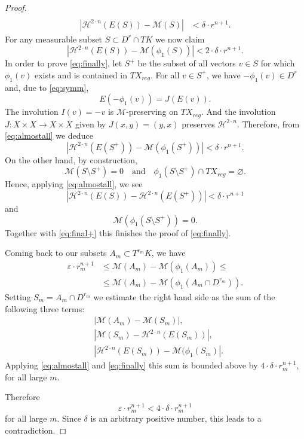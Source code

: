 \documentclass[12pt,leqno,intlimits]{amsart}
\numberwithin{equation}{section}
\theoremstyle{definition}
\theoremstyle{remark}
\def\:{\colon}
\def\emptyset{\varnothing}
\begin{document}
\begin{proof}
\begin{equation}
\begin{aligned}
\\
|\mathcal H^{2\cdot n} (E(S)) - \mathcal M (S)| &< \delta{\cdot}r^{n+1}.
\end{aligned}
\end{equation}
For any measurable subset $S\subset D^r \cap TK$ we now claim
\begin{equation} \label{eq:finally}
|\mathcal H^{2\cdot n} (E(S)) - \mathcal M (\phi _1 (S))| < 2{\cdot}\delta{\cdot}r^{n+1}.
\end{equation}
In order to prove \eqref{eq:finally}, let $S^+$ be the subset of all vectors $v\in S $ for which $\phi_1 (v)$ exists and is contained in $TX_{reg}$.
For all $v\in S^+$, we have $-\phi _1 (v) \in D^r$ and, due to \eqref{eq:symm},
$$E(-\phi_1 (v)) =J(E(v)).$$
The involution $I(v)=-v$ is $\mathcal M$-preserving on $TX_{reg}$. And the involution
$J\:X\times X\to X\times X$ given by $J(x,y)=(y,x)$ preserves $\mathcal H^{2\cdot n}$. Therefore, from \eqref{eq:almostall} we deduce
\begin{equation} \label{eq:final+}
|\mathcal H^{2\cdot n} (E(S^+)) - \mathcal M (\phi _1 (S^+))| < \delta{\cdot}r^{n+1}.
\end{equation}
On the other hand, by construction,
$$ \mathcal M (S\setminus S^+ )=0
\quad\text{and}\quad
\phi _1 (S\setminus S^+)\cap TX_{reg} =\emptyset.$$
Hence, applying \eqref{eq:almostall}, we see
\[
|\mathcal H^{2\cdot n} (E(S))- \mathcal H^{2\cdot n} (E(S^+))|< \delta{\cdot}r^{n+1}\]
and
\[\mathcal M (\phi _1 (S\setminus S^+)) =0.\]
Together with \eqref{eq:final+} this finishes the proof of \eqref{eq:finally}.

Coming back to our subsets $A_m\subset T^{r_m} K$, we have
\begin{align*}
\varepsilon \cdot r_m^ {n+1} &\leq \mathcal M ( A_m) - \mathcal M( \phi _1 (A_m)) \leq
\\
&\leq\mathcal M ( A_m) - \mathcal M( \phi _1 (A_m\cap D^{r_m})).
\end{align*}
Setting $S_m=A_m\cap D^{r_m}$ we estimate the right hand side as the sum of the following three terms:
\begin{align*}
&|\mathcal M (A_m) - \mathcal M(S_m)|,
\\
&|\mathcal M (S_m ) - \mathcal H^{2\cdot n} (E(S_m) )|,
\\
&| \mathcal H ^{2\cdot n} (E(S_m)) - \mathcal M (\phi _1(S_m)|.
\end{align*}
Applying \eqref{eq:almostall} and \eqref{eq:finally} this sum is bounded above by $4{\cdot}\delta{\cdot} r _m^{n+1}$, for all large $m$.

Therefore
\[\varepsilon \cdot r_m^ {n+1}< 4{\cdot} \delta{\cdot} r _m^{n+1}\]
for all large $m$.
Since $\delta$ is an arbitrary positive number, this leads to a contradiction.
\end{proof}
\end{document}
